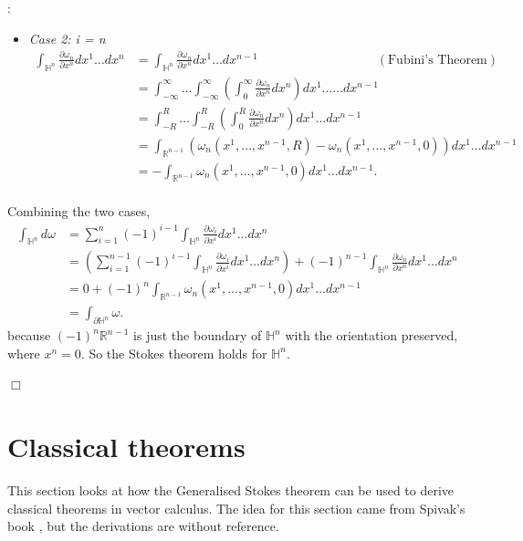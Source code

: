 \documentclass{article}
\def\endproofmark{$\Box$}
\newenvironment{proof}{\par\noindent{\bf Proof}:}{\endproofmark\smallskip}
\begin{document}
\begin{proof}
\begin{itemize}
\begin{itemize}
            \item \emph{Case 2: i = n}
            \begin{align*}
                \int_{\mathbb{H}^n}   \frac{\partial \omega_n}{\partial x^n} dx^1 \ldots dx^n &= \int_{\mathbb{H}^n}   \frac{\partial \omega_n}{\partial x^n} dx^1 \ldots dx^{n-1}  \ \ \ \ \ \ \ \ \ \ \ \ \ \ \ \ \ \ \ \ \ \ \ \ \ \ \ \ \ \ \ \ \ \ \ \ \  \ \ \ \ \  (\text{Fubini's Theorem})  \\
                &=\int_{-\infty}^{\infty} \ldots \int_{-\infty}^{\infty} \left(\int_{0}^{\infty} \frac{\partial \omega_n}{\partial x^n} dx^n\right) dx^1 \ldots \ldots dx^{n-1} \\
                &= \int_{-R}^{R} \ldots \int_{-R}^{R} \left(\int_{0}^{R} \frac{\partial \omega_n}{\partial x^n} dx^n\right) dx^1 \ldots dx^{n-1} \\
                &= \int_{\mathbb{R}^{n-1}} \left( \omega_n(x^1, \ldots, x^{n-1}, R) - \omega_n(x^1, \ldots, x^{n-1}, 0) \right) dx^1 \ldots dx^{n-1} \\
                &= -\int_{\mathbb{R}^{n-1}} \omega_n(x^1, \ldots, x^{n-1}, 0) dx^1 \ldots dx^{n-1}.   \\
            \end{align*}
        \end{itemize}
        Combining the two cases, 
        \begin{align*}
            \int_{\mathbb{H}^n} d\omega &= \sum_{i=1}^n (-1)^{i-1} \int_{\mathbb{H}^n}   \frac{\partial \omega_i}{\partial x^i} dx^1 \ldots dx^n \\
            &= \left( \sum_{i=1}^{n-1} (-1)^{i-1} \int_{\mathbb{H}^n}   \frac{\partial \omega_i}{\partial x^i} dx^1 \ldots dx^n \right) + (-1)^{n-1} \int_{\mathbb{H}^n}   \frac{\partial \omega_n}{\partial x^n} dx^1 \ldots dx^n \\
            &= 0 + (-1)^n \int_{\mathbb{R}^{n-1}} \omega_n(x^1, \ldots, x^{n-1}, 0) dx^1 \ldots dx^{n-1} \\
            &= \int_{\partial \mathbb{H}^n} \omega.
        \end{align*}
        because $(-1)^n \mathbb{R}^{n-1}$ is just the boundary of $\mathbb{H}^n$ with the orientation preserved, where $x^n = 0$. So the Stokes theorem holds for $\mathbb{H}^n$.
    \end{itemize}
\end{proof}
\section{Classical theorems}
This section looks at how the Generalised Stokes theorem can be used to derive classical theorems in vector calculus. The idea for this section came from Spivak's book \cite{spivak1971calculus}, but the derivations are without reference.
\end{document}
